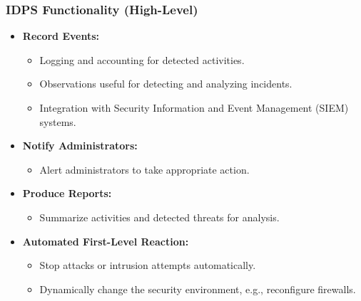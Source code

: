 \subsubsection{IDPS Functionality (High-Level)}
\begin{itemize}
    \item \textbf{Record Events:}
    \begin{itemize}
        \item Logging and accounting for detected activities.
        \item Observations useful for detecting and analyzing incidents.
        \item Integration with Security Information and Event Management (SIEM) systems.
    \end{itemize}
    \item \textbf{Notify Administrators:}
    \begin{itemize}
        \item Alert administrators to take appropriate action.
    \end{itemize}
    \item \textbf{Produce Reports:}
    \begin{itemize}
        \item Summarize activities and detected threats for analysis.
    \end{itemize}
    \item \textbf{Automated First-Level Reaction:}
    \begin{itemize}
        \item Stop attacks or intrusion attempts automatically.
        \item Dynamically change the security environment, e.g., reconfigure firewalls.
    \end{itemize}
\end{itemize}

